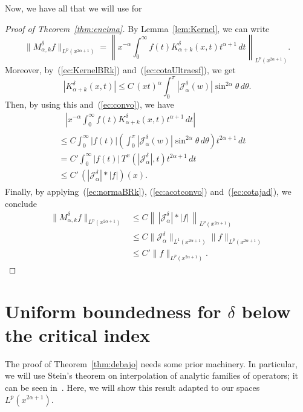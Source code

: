 \documentclass{amsart}
\theoremstyle{remark}
\newcommand{\Jad}[1][\delta]{\mathcal{J}_{\alpha}^{#1}}
\newcommand{\BRk}{M_{\alpha,k}^{\delta}}
\newcommand{\KBRk}{K_{\alpha+k}^{\delta}} %
\newcommand{\lpnorm}[2]{\|{#1}\|_{L^{#2}(x^{2\alpha+1})}}
\newcommand{\biglpnorm}[2]{\left\|{#1}\right\|_{L^{#2}(x^{2\alpha+1})}}
\begin{document}
Now, we have all that we will use for

\begin{proof}[Proof of Theorem~\ref{thm:encima}]
By Lemma~\ref{lem:Kernel}, we can write
\begin{equation}
\label{ec:normaBRk}
    \lpnorm{\BRk f}{p} = \biglpnorm{ x^{-\alpha}
         \int_0^{\infty} f(t) \KBRk(x,t) t^{\alpha+1} \, dt }{p}.
\end{equation}
Moreover, by~(\ref{ec:KernelBRk}) and~(\ref{ec:cotaUltraesf}), we get
\begin{equation*}
    \left| \KBRk(x,t) \right|
      \le C \, (xt)^{\alpha} \int_0^{\pi} |\Jad(w)|
         \sin^{2\alpha}\theta \, d\theta.
\end{equation*}
Then, by using this and~(\ref{ec:convo}), we have 
\begin{multline*}
    \qquad
    \left| x^{-\alpha}
      \int_0^{\infty} f(t) \KBRk(x,t) t^{\alpha+1} \, dt
    \right| \\
    \begin{aligned}
      &\le C \int_0^{\infty} |f(t)|
               \left( \int_0^{\pi} |\Jad(w)|
                 \sin^{2\alpha}\theta \,d\theta \right) t^{2\alpha+1} \, dt
                   \qquad \\
      &= C' \int_0^{\infty} |f(t)|\, T^x(|\Jad|,t)
             t^{2\alpha+1}\, dt\\
      &\le C' \, (|\Jad|*|f|)(x).
    \end{aligned}
\end{multline*}
Finally, by applying~(\ref{ec:normaBRk}), (\ref{ec:acotconvo})
and~(\ref{ec:cotajad}), we conclude
\begin{align*}
    \lpnorm{\BRk f}{p}
    & \le C \biglpnorm{\,|\Jad|*|f|\,}{p} \\
    & \le C \lpnorm{\Jad}{1} \lpnorm{f}{p} \\
    & \le C' \lpnorm{f}{p}.
\end{align*}
\end{proof}


\section{Uniform boundedness for $\delta$ below the critical index}
\label{sec:debajo}

The proof of Theorem~\ref{thm:debajo} needs some prior machinery.
In particular, we will use Stein's theorem on interpolation of analytic
families of operators; it can be seen in~\cite{St-Int}. Here, we will show
this result adapted to our spaces~$L^p(x^{2\alpha+1})$.
\end{document}
